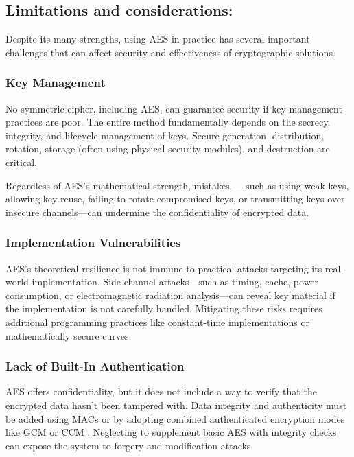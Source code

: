 \subsection{Limitations and considerations:}

Despite its many strengths, using AES in practice has several important challenges that can affect security 
and effectiveness of cryptographic solutions.

\subsubsection*{Key Management}

No symmetric cipher, including AES, can guarantee security if key management practices are poor. The entire 
method fundamentally depends on the secrecy, integrity, and lifecycle management of keys. Secure generation, 
distribution, rotation, storage (often using physical security modules), and destruction are critical.

Regardless of AES's mathematical strength, mistakes — such as using weak keys, allowing key reuse, failing to 
rotate compromised keys, or transmitting keys over insecure channels—can undermine the confidentiality of 
encrypted data.

\subsubsection*{Implementation Vulnerabilities}

AES's theoretical resilience is not immune to practical attacks targeting its real-world implementation. 
Side-channel attacks—such as timing, cache, power consumption, or electromagnetic radiation analysis—can 
reveal key material if the implementation is not carefully handled. Mitigating these risks requires additional 
programming practices like constant-time implementations or mathematically secure curves.

\subsubsection*{Lack of Built-In Authentication}
AES offers confidentiality, but it does not include a way to verify that the encrypted data hasn't been tampered 
with. Data integrity and authenticity must be added using \Gls{MAC}s or by adopting combined authenticated encryption 
modes like \Gls{GCM} or \Gls{CCM} \cite{rfc4494}. Neglecting to supplement basic AES with integrity checks can expose the system to forgery 
and modification attacks.